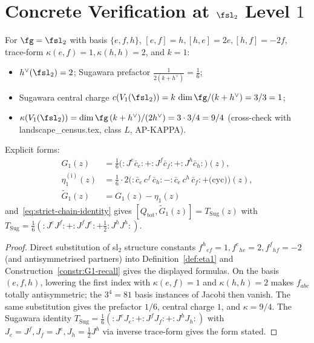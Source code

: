 \section{Concrete Verification at \texorpdfstring{$\fsl_2$}{sl2} Level $1$}
\label{sec:sl2-verification}

\begin{proposition}
\label{prop:eta-formula-sl2-k1-explicit}
\ClaimStatusProvedHere
For $\fg = \fsl_2$ with basis $\{e,f,h\}$,
$[e,f]=h, [h,e]=2e, [h,f]=-2f$, trace-form
$\kappa(e,f)=1, \kappa(h,h)=2$, and $k=1$:
\begin{itemize}
 \item $h^\vee(\fsl_2) = 2$; Sugawara prefactor
 $\tfrac{1}{2(k+h^\vee)} = \tfrac{1}{6}$;
 \item Sugawara central charge
 $c(V_1(\fsl_2)) = k\,\dim\fg/(k+h^\vee) = 3/3 = 1$;
 \item $\kappa(V_1(\fsl_2))
 = \dim\fg\,(k+h^\vee)/(2 h^\vee) = 3\cdot 3/4 = 9/4$
 \textup{(}cross-check with landscape\_census.tex,
 class $L$, AP-KAPPA\textup{)}.
\end{itemize}
Explicit forms:
\begin{align*}
 G_1(z) &= \tfrac{1}{6}\bigl(
 {:}J^e \bar c_e{:} + {:}J^f \bar c_f{:} + {:}J^h \bar c_h{:}
 \bigr)(z), \\
 \eta_1^{(\mathrm i)}(z) &= \tfrac{1}{6}\cdot 2\bigl(
 {:}\bar c_e\,c^f\,\bar c_h{:} -
 {:}\bar c_e\,c^h\,\bar c_f{:} +
 \text{(cyc)}
 \bigr)(z), \\
 \widetilde G_1(z) &= G_1(z) - \eta_1(z)
\end{align*}
and~\eqref{eq:strict-chain-identity} gives
$[Q_{\mathrm{tot}}, \widetilde G_1(z)] = T_{\mathrm{Sug}}(z)$
with
$T_{\mathrm{Sug}}
 = \tfrac{1}{6}({:}J^e J^f{:} + {:}J^f J^e{:}
 + \tfrac{1}{2}{:}J^h J^h{:})$.
\end{proposition}

\begin{proof}
Direct substitution of sl$_2$ structure constants
$f^h{}_{ef}=1, f^e{}_{he}=2, f^f{}_{hf}=-2$ (and antisymmetrised
partners) into Definition~\ref{def:eta1} and
Construction~\ref{constr:G1-recall} gives the displayed formulas.
On the basis $(e,f,h)$, lowering the first index with
$\kappa(e,f)=1$ and $\kappa(h,h)=2$ makes $f_{abc}$ totally
antisymmetric; the $3^4=81$ basis instances of Jacobi then vanish.
The same substitution gives the prefactor $1/6$, central charge
$1$, and $\kappa = 9/4$. The Sugawara identity
$T_{\mathrm{Sug}} = \tfrac{1}{6}({:}J^e J_e{:} + {:}J^f J_f{:}
 + {:}J^h J_h{:})$ with $J_e = J^f, J_f = J^e, J_h = \tfrac{1}{2} J^h$
via inverse trace-form gives the form stated.
\end{proof}

